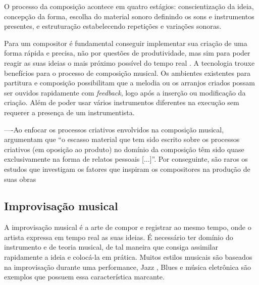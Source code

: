 O processo da composição acontece em quatro estágios: conscientização da ideia, concepção da forma, escolha do material sonoro definindo os sons e instrumentos presentes, e estruturação estabelecendo repetições e variações sonoras. %

Para um compositor é fundamental conseguir implementar sua criação de uma forma rápida e precisa, não por questões de produtividade, mas sim para poder reagir as suas ideias o mais próximo possível do tempo real \cite{Barbosa1999}. A tecnologia trouxe benefícios para o processo de composição musical. Os ambientes existentes para partitura e composição possibilitam que a melodia ou os arranjos criados possam ser ouvidos rapidamente com \textit{feedback}, logo após a inserção ou modificação da criação. Além de poder usar vários instrumentos diferentes na execução sem requerer a presença de um instrumentista. 	

----Ao enfocar os processos criativos envolvidos na composição musical, argumentam que “o escasso material que tem sido escrito sobre os processos criativos (em oposição ao produto) no domínio da composição têm sido quase exclusivamente na forma de relatos pessoais [...]”. Por conseguinte, são raros os estudos que investigam os fatores que inspiram os compositores na produção de suas obras


\subsection{Improvisação musical}	
A improvisação musical é a arte de compor e registrar ao mesmo tempo, onde o artista expressa em tempo real as suas ideias. É necessário ter domínio do instrumento e de teoria musical, de tal maneira que consiga assimilar rapidamente a ideia e colocá-la em prática. Muitos estilos musicais são baseados na improvisação durante uma performance, Jazz , Blues e música eletrônica são exemplos que possuem essa característica marcante.

	